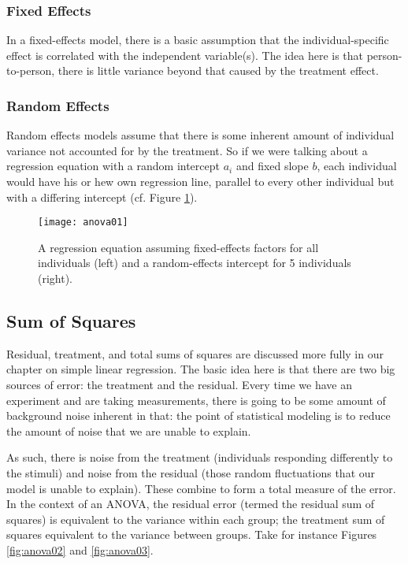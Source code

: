 \subsubsection{Fixed Effects}

In a fixed-effects model, there is a basic assumption that the individual-specific effect is correlated with the independent variable(s). The idea here is that person-to-person, there is little variance beyond that caused by the treatment effect.

\subsubsection{Random Effects}

Random effects models assume that there is some inherent amount of individual variance not accounted for by the treatment. So if we were talking about a regression equation with a random intercept $a_i$ and fixed slope $b$, each individual would have his or hew own regression line, parallel to every other individual but with a differing intercept (cf. Figure \ref{fig:anova01}).

\begin{figure}[h]
\texttt{[image: anova01]}
\caption{A regression equation assuming fixed-effects factors for all individuals (left) and a random-effects intercept for 5 individuals (right).}
\label{fig:anova01}
\end{figure}

\subsection{Sum of Squares}

Residual, treatment, and total sums of squares are discussed more fully in our chapter on simple linear regression. The basic idea here is that there are two big sources of error: the treatment and the residual. Every time we have an experiment and are taking measurements, there is going to be some amount of background noise inherent in that: the point of statistical modeling is to reduce the amount of noise that we are unable to explain.

As such, there is noise from the treatment (individuals responding differently to the stimuli) and noise from the residual (those random fluctuations that our model is unable to explain). These combine to form a total measure of the error. In the context of an ANOVA, the residual error (termed the residual sum of squares) is equivalent to the variance within each group; the treatment sum of squares equivalent to the variance between groups. Take for instance Figures \ref{fig:anova02} and \ref{fig:anova03}.

